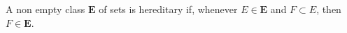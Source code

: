 A non empty class $\mathbf{E}$ of sets is hereditary if, whenever $E \in \mathbf{E}$ and $F \subset E$, then $F \in \mathbf{E}$.
